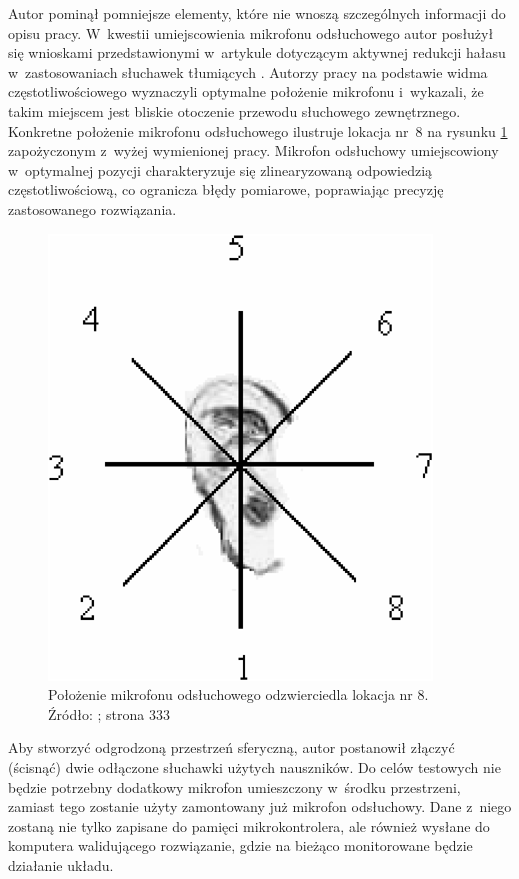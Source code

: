 Autor pominął pomniejsze elementy, które nie wnoszą szczególnych informacji do opisu pracy. W~kwestii umiejscowienia mikrofonu odsłuchowego autor posłużył się wnioskami przedstawionymi w~artykule dotyczącym aktywnej redukcji hałasu w~zastosowaniach słuchawek tłumiących \cite{ANC4HP}. Autorzy pracy na podstawie widma częstotliwościowego wyznaczyli optymalne położenie mikrofonu i~wykazali, że takim miejscem jest bliskie otoczenie przewodu słuchowego zewnętrznego. Konkretne położenie mikrofonu odsłuchowego ilustruje lokacja nr~8 na rysunku \ref{fig:error_mic_placement} zapożyczonym z~wyżej wymienionej pracy.
Mikrofon odsłuchowy umiejscowiony w~optymalnej pozycji charakteryzuje się zlinearyzowaną odpowiedzią częstotliwościową, co ogranicza błędy pomiarowe, poprawiając precyzję zastosowanego rozwiązania.
\begin{figure}[h!]
	\centering
	\includegraphics[scale=0.6]{../Assets/error_mic_placement.png}
	\caption{Położenie mikrofonu odsłuchowego odzwierciedla lokacja nr 8.\\ Źródło: ; strona 333}
	\label{fig:error_mic_placement}
\end{figure}

Aby stworzyć odgrodzoną przestrzeń sferyczną, autor postanowił złączyć (ścisnąć) dwie odłączone słuchawki użytych nauszników. Do celów testowych nie będzie potrzebny dodatkowy mikrofon umieszczony w~środku przestrzeni, zamiast tego zostanie użyty zamontowany już mikrofon odsłuchowy. Dane z~niego zostaną nie tylko zapisane do pamięci mikrokontrolera, ale również wysłane do komputera walidującego rozwiązanie, gdzie na bieżąco monitorowane będzie działanie układu.


